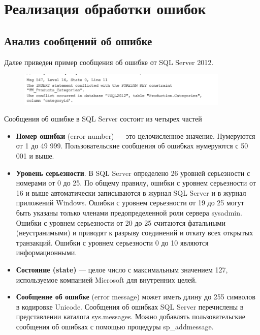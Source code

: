 \section{Реализация обработки ошибок}

\subsection{Анализ сообщений об ошибке }
Далее приведен пример сообщения об ошибке от SQL Server 2012. 

\begin{figure}[h!]
	\begin{center}
		\includegraphics[width=0.9\textwidth]{img/error.png}
	\end{center}
	\captionsetup{justification=centering}
\end{figure}

Сообщения об ошибке в SQL Server состоит из четырех частей
\begin{itemize}
	\item \textbf{Номер ошибки} (error number) — это целочисленное значение. Нумеруются от 1 до 49 999. Пользовательские сообщения об ошибках нумеруются с 50 001 и выше.
	\item \textbf{Уровень серьезности}. В SQL Server определено 26 уровней серьезности с номерами от 0 до 25. По общему правилу, ошибки с уровнем серьезности от 16 и выше автоматически записываются в журнал SQL Server и в журнал приложений Windows. Ошибки с уровнем серьезности от 19 до 25 могут быть указаны только членами предопределенной роли сервера sysadmin. Ошибки с уровнем серьезности от 20 до 25 считаются фатальными (неустранимыми) и приводят к разрыву соединений и откату всех открытых транзакций. Ошибки с уровнем серьезности 0 до 10 являются информационными. 
	\item \textbf{Состояние (state)} --- целое число с максимальным значением 127, используемое
	компанией Microsoft для внутренних целей. 
	\item \textbf{Сообщение об ошибке} (error message) может иметь длину до 255 символов в кодировке Unicode. Сообщения об ошибках SQL Server перечислены в представлении каталога
	sys.messages. Можно добавлять пользовательские сообщения об ошибках с помощью процедуры sp\_addmessage. 
\end{itemize}

